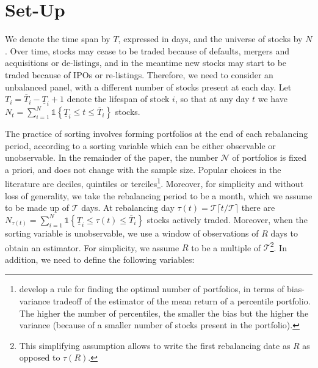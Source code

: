 
\section{Set-Up}
\label{Set-Up}

We denote the time span by $T$, expressed in days, and the universe of stocks by $N$. Over time, stocks may cease to be traded because of defaults, mergers and acquisitions or de-listings, and in the meantime new stocks may start to be traded because of IPOs or re-listings. Therefore, we need to consider an unbalanced panel, with a different number of stocks present at each day. Let $T_{i}=\overline{T}_{i}-\underline{T}_{i}+1$ denote the lifespan of stock $i$, so that at any day $t$ we have $N_t=\sum_{i=1}^{N} \mathds{1} \left\{ \underline{T}_{i}\leq t\leq \overline{T}_{i}\right\} $ stocks. 

The practice of sorting involves forming portfolios at the end of each rebalancing period, according to a sorting variable which can be either observable or unobservable. In the remainder of the paper, the number $\mathcal{N}$ of portfolios is fixed a priori, and does not change with the sample size. Popular choices in the literature are deciles, quintiles or terciles\footnote{\cite{cattaneo2020characteristic} develop a rule for finding the optimal number of portfolios, in terms of bias-variance tradeoff of the estimator of the mean return of a percentile portfolio. The higher the number of percentiles, the smaller the bias but the higher the variance (because of a smaller number of stocks present in the portfolio).}. Moreover, for simplicity and without loss of generality, we take the rebalancing period to be a month, which we assume to be made up of $\mathcal{T}$ days. At rebalancing day $\tau(t) = \mathcal{T} \lceil t/\mathcal{T} \rceil$ there are $N_{\tau(t)}=\sum_{i=1}^{N} \mathds{1} \left\{ \underline{T}_{i} \leq \tau(t) \leq \overline{T}_{i} \right\}$ stocks actively traded. Moreover, when the sorting variable is unobservable, we use a window of observations of $R$ days to obtain an estimator. For simplicity, we assume $R$ to be a multiple of $\mathcal{T}$\footnote{This simplifying assumption allows to write the first rebalancing date as $R$ as opposed to $\tau(R)$.}. In addition, we need to define the following variables:

